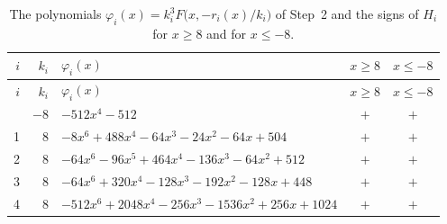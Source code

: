 \documentclass[11pt]{article}
\begin{document}
\begingroup\footnotesize
\setlength{\LTcapwidth}{\textwidth}
\begin{longtable}{@{}rrlcc@{}}
\caption{The polynomials $\varphi_i(x)=k_i^3F\bigl(x,-r_i(x)/k_i\bigr)$ of Step~2 and the signs of $H_i$ for $x\geq8$ and for $x\leq-8$.}\label{tab:phi}\\
\hline $i$ & $k_i$ & $\varphi_i(x)$ & $x\geq8$ & $x\leq-8$\\\hline\endfirsthead\hline $i$ & $k_i$ & $\varphi_i(x)$ & $x\geq8$ & $x\leq-8$\\\hline\endhead\hline\endfoot
0 & $-8$ & $-512x^{4}-512$ & $+$ & $+$\\
1 & $8$ & $-8x^{6}+488x^{4}-64x^{3}-24x^{2}-64x+504$ & $+$ & $+$\\
2 & $8$ & $-64x^{6}-96x^{5}+464x^{4}-136x^{3}-64x^{2}+512$ & $+$ & $+$\\
3 & $8$ & $-64x^{6}+320x^{4}-128x^{3}-192x^{2}-128x+448$ & $+$ & $+$\\
4 & $8$ & $-512x^{6}+2048x^{4}-256x^{3}-1536x^{2}+256x+1024$ & $+$ & $+$\\
\end{longtable}
\endgroup
\end{document}
